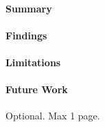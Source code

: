 \documentclass[12pt,a4paper,openright,twoside]{book}
\begin{document}
\paragraph{Summary}

\paragraph{Findings}

\paragraph{Limitations}

\paragraph{Future Work}

\backmatter

\nocite{*}




\begin{acknowledgements}
Optional. Max 1 page.
\end{acknowledgements}
\end{document}
